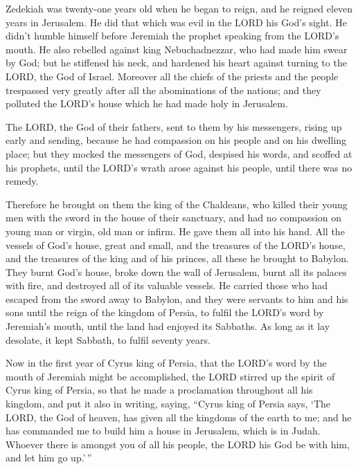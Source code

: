  Zedekiah was twenty-one years old when he began to reign,
and he reigned eleven years in Jerusalem.  He did that
which was evil in the LORD his God's sight. He didn't humble himself
before Jeremiah the prophet speaking from the LORD's mouth.
 He also rebelled against king Nebuchadnezzar, who had made
him swear by God; but he stiffened his neck, and hardened his heart
against turning to the LORD, the God of Israel.  Moreover
all the chiefs of the priests and the people trespassed very greatly
after all the abominations of the nations; and they polluted the LORD's
house which he had made holy in Jerusalem.

 The LORD, the God of their fathers, sent to them by his
messengers, rising up early and sending, because he had compassion on
his people and on his dwelling place;  but they mocked the
messengers of God, despised his words, and scoffed at his prophets,
until the LORD's wrath arose against his people, until there was no
remedy.

 Therefore he brought on them the king of the Chaldeans,
who killed their young men with the sword in the house of their
sanctuary, and had no compassion on young man or virgin, old man or
infirm. He gave them all into his hand.  All the vessels of
God's house, great and small, and the treasures of the LORD's house, and
the treasures of the king and of his princes, all these he brought to
Babylon.  They burnt God's house, broke down the wall of
Jerusalem, burnt all its palaces with fire, and destroyed all of its
valuable vessels.  He carried those who had escaped from
the sword away to Babylon, and they were servants to him and his sons
until the reign of the kingdom of Persia,  to fulfil the
LORD's word by Jeremiah's mouth, until the land had enjoyed its
Sabbaths. As long as it lay desolate, it kept Sabbath, to fulfil seventy
years.

 Now in the first year of Cyrus king of Persia, that the
LORD's word by the mouth of Jeremiah might be accomplished, the LORD
stirred up the spirit of Cyrus king of Persia, so that he made a
proclamation throughout all his kingdom, and put it also in writing,
saying,  ``Cyrus king of Persia says, `The LORD, the God of
heaven, has given all the kingdoms of the earth to me; and he has
commanded me to build him a house in Jerusalem, which is in Judah.
Whoever there is amongst you of all his people, the LORD his God be with
him, and let him go up.'\,''
